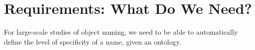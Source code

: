 
\section{Requirements: What Do We Need? }
For large-scale studies of object naming, we need to be able to automatically define the level of specificity of a name, given an ontology. 